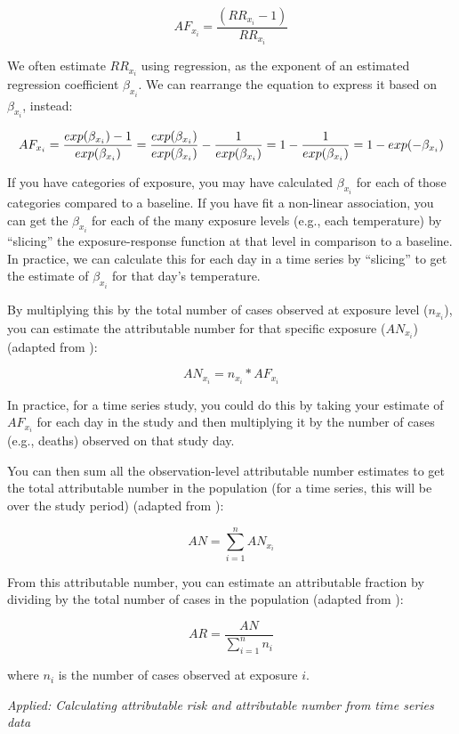 \documentclass[
]{book}
\begin{document}
\[
AF_{x_i} = \frac{(RR_{x_i} - 1)}{RR_{x_i}}
\]

We often estimate \(RR_{x_i}\) using regression, as the exponent of an estimated regression coefficient \(\beta_{x_i}\). We can rearrange the equation to express it based on \(\beta_{x_i}\), instead:

\[
AF_{x_i} = \frac{exp(\beta_{x_i}) - 1}{exp(\beta_{x_i})} \\
= \frac{exp(\beta_{x_i})}{exp(\beta_{x_i})} - \frac{1}{exp(\beta_{x_i})} \\
= 1 - \frac{1}{exp(\beta_{x_i})} \\
= 1 - exp(-\beta_{x_i})
\]

If you have categories of exposure, you may have calculated \(\beta_{x_i}\) for each of those categories compared to a baseline. If you have fit a non-linear association, you can get the \(\beta_{x_i}\) for each of the many exposure levels (e.g., each temperature) by ``slicing'' the exposure-response function at that level in comparison to a baseline. In practice, we can calculate this for each day in a time series by ``slicing'' to get the estimate of \(\beta_{x_i}\) for that day's temperature.

By multiplying this by the total number of cases observed at exposure level (\(n_{x_i}\)), you can estimate the attributable number for that specific exposure (\(AN_{x_i}\)) (adapted from \citet{gasparrini2014attributable}):

\[
AN_{x_i} = n_{x_i} * AF_{x_i}
\]

In practice, for a time series study, you could do this by taking your estimate of \(AF_{x_i}\) for each day in the study and then multiplying it by the number of cases (e.g., deaths) observed on that study day.

You can then sum all the observation-level attributable number estimates to get the total attributable number in the population (for a time series, this will be over the study period) (adapted from \citet{gasparrini2014attributable}):

\[
AN = \sum_{i=1}^{n}{AN_{x_i}} 
\]

From this attributable number, you can estimate an attributable fraction by dividing by the total number of cases in the population (adapted from \citet{gasparrini2014attributable}):

\[
AR = \frac{AN}{\sum_{i=1}^{n}{n_i}}
\]

where \(n_i\) is the number of cases observed at exposure \(i\).

\emph{Applied: Calculating attributable risk and attributable number from time series data}
\end{document}
